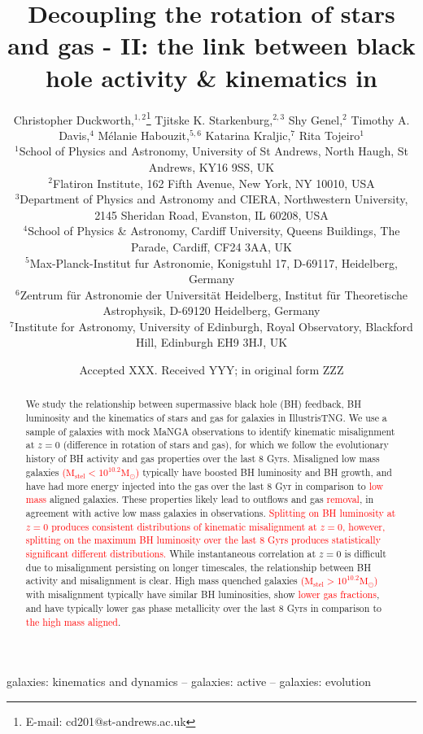 \documentclass[fleqn,usenatbib]{mnras}
\title[Decoupling the rotation of stars and gas - II]{Decoupling the rotation of stars and gas - II: the link between black hole activity \& \red{simulated IFU} kinematics in \red{IllustrisTNG}}
\author[C. Duckworth et al.]
{Christopher Duckworth,$^{1,2}$\thanks{E-mail: cd201@st-andrews.ac.uk}
Tjitske K. Starkenburg,$^{2,3}$ 
Shy Genel,$^{2}$ \newauthor
Timothy A. Davis,$^{4}$ 
M\'elanie Habouzit,$^{5,6}$
Katarina Kraljic,$^{7}$
Rita Tojeiro$^{1}$ 
\\
$^{1}$School of Physics and Astronomy, University of St Andrews, North Haugh, St Andrews, KY16 9SS, UK\\
$^{2}$Flatiron Institute, 162 Fifth Avenue, New York, NY 10010, USA\\
$^{3}$Department of Physics and Astronomy and CIERA, Northwestern University, 2145 Sheridan Road, Evanston, IL 60208, USA\\
$^{4}$School of Physics \& Astronomy, Cardiff University, Queens Buildings, The Parade, Cardiff, CF24 3AA, UK\\
$^{5}$Max-Planck-Institut fur Astronomie, Konigstuhl 17, D-69117, Heidelberg, Germany\\
$^{6}$Zentrum f\"ur Astronomie der Universit\"at Heidelberg, Institut f\"ur Theoretische Astrophysik, D-69120 Heidelberg, Germany\\
$^{7}$Institute for Astronomy, University of Edinburgh, Royal Observatory, Blackford Hill, Edinburgh EH9 3HJ, UK\\
}
\date{Accepted XXX. Received YYY; in original form ZZZ}
\newcommand{\red}[1]{{\textcolor{red}{#1}}}
\begin{document}
\label{firstpage}
\pagerange{\pageref{firstpage}--\pageref{lastpage}}
\maketitle

\begin{abstract}
We study the relationship between supermassive black hole (BH) feedback, BH luminosity and the kinematics of stars and gas for galaxies in IllustrisTNG. We use a sample of galaxies with mock MaNGA observations to identify kinematic misalignment at $z=0$ (difference in rotation of stars and gas), for which we follow the evolutionary history of BH activity and gas properties over the last 8 Gyrs. Misaligned low mass galaxies \red{($\mathrm{M_{stel} < 10^{10.2}M_{\odot}}$)} typically have boosted BH luminosity and BH growth, and have had more energy injected into the gas over the last 8 Gyr in comparison to \red{low mass} aligned galaxies. These properties likely lead to outflows and gas \red{removal}, in agreement with active low mass galaxies in observations. \red{Splitting on BH luminosity at $z=0$ produces consistent distributions of kinematic misalignment at $z=0$, however, splitting on the maximum BH luminosity over the last 8 Gyrs produces statistically significant different distributions.} While instantaneous correlation at $z=0$ is difficult due to misalignment persisting on longer timescales, the relationship between BH activity and misalignment is clear. High mass quenched galaxies \red{($\mathrm{M_{stel} > 10^{10.2}M_{\odot}}$)} with misalignment typically have similar BH luminosities, show \red{lower gas fractions}, and have typically lower gas phase metallicity over the last 8 Gyrs in comparison to \red{the high mass aligned}.
\end{abstract}

\begin{keywords}
galaxies: kinematics and dynamics -- galaxies: active -- galaxies: evolution
\end{keywords}


\end{document}
